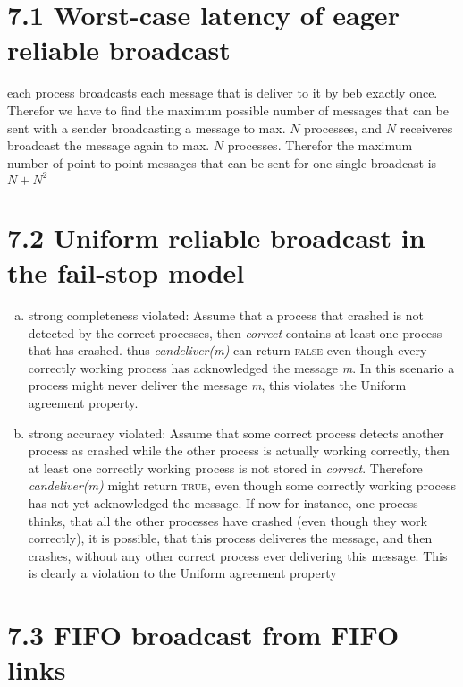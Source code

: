 \documentclass{article}
\begin{document}
	\pagestyle{fancy}
	
    \section*{7.1 Worst-case latency of eager reliable broadcast}
    each process broadcasts each message that is deliver to it by beb exactly once.
    Therefor we have to find the maximum possible number of messages that can be sent with a sender broadcasting a message to max. $N$ processes,
    and $N$ receiveres broadcast the message again to max. $N$ processes.
    Therefor the maximum number of point-to-point messages that can be sent for one single broadcast is $N + N^2$

    \section*{7.2 Uniform reliable broadcast in the fail-stop model}
    \begin{enumerate}[a)]
        \item strong completeness violated: Assume that a process that crashed is not detected by the correct processes,
        then \textit{correct} contains at least one process that has crashed.
        thus \textit{candeliver(m)} can return \textsc{false} even though every correctly working process has acknowledged the message \textit{m}.
        In this scenario a process might never deliver the message \textit{m}, this violates the Uniform agreement property.
        
        \item strong accuracy violated: Assume that some correct process detects another process as crashed while the other process is actually working correctly,
        then at least one correctly working process is not stored in \textit{correct}.
        Therefore \textit{candeliver(m)} might return \textsc{true}, even though some correctly working process has not yet acknowledged the message.
        If now for instance, one process thinks, that all the other processes have crashed (even though they work correctly), it is possible, that this process deliveres the message, and then crashes, without any other correct process ever delivering this message.
        This is clearly a violation to the Uniform agreement property
    \end{enumerate}
    \section*{7.3 FIFO broadcast from FIFO links}
\end{document}
